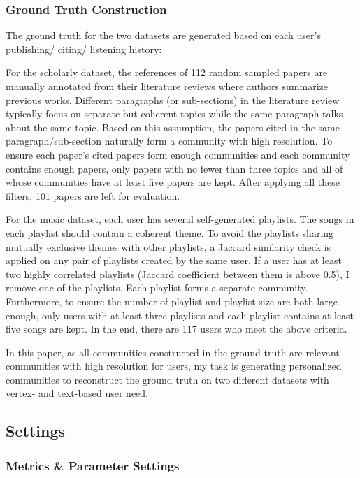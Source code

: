 \subsubsection{Ground Truth Construction}

The ground truth for the two datasets are generated based on each user's publishing/ citing/ listening history:

For the scholarly dataset, the references of 112 random sampled papers are manually annotated from their literature reviews where authors summarize previous works. Different paragraphs (or sub-sections) in the literature review typically focus on separate but coherent topics while the same paragraph talks about the same topic. Based on this assumption, the papers cited in the same paragraph/sub-section naturally form a community with high resolution. To ensure each paper's cited papers form enough communities and each community contains enough papers, only papers with no fewer than three topics and all of whose communities have at least five papers are kept. After applying all these filters, 101 papers are left for evaluation.  

For the music dataset, each user has several self-generated playlists. The songs in each playlist should contain a coherent theme. To avoid the playlists sharing mutually exclusive themes with other playlists, a Jaccard similarity check is applied on any pair of playlists created by the same user. If a user has at least two highly correlated playlists (Jaccard coefficient between them is above 0.5), I remove one of the playlists. Each playlist forms a separate community. Furthermore, to ensure the number of playlist and playlist size are both large enough, only users with at least three playlists and each playlist contains at least five songs are kept. In the end, there are 117 users who meet the above criteria. 

In this paper, as all communities constructed in the ground truth are relevant communities with high resolution for users, my task is generating personalized communities to reconstruct the ground truth on two different datasets with vertex- and text-based user need. 

\subsection{Settings}

\subsubsection{Metrics \& Parameter Settings}

